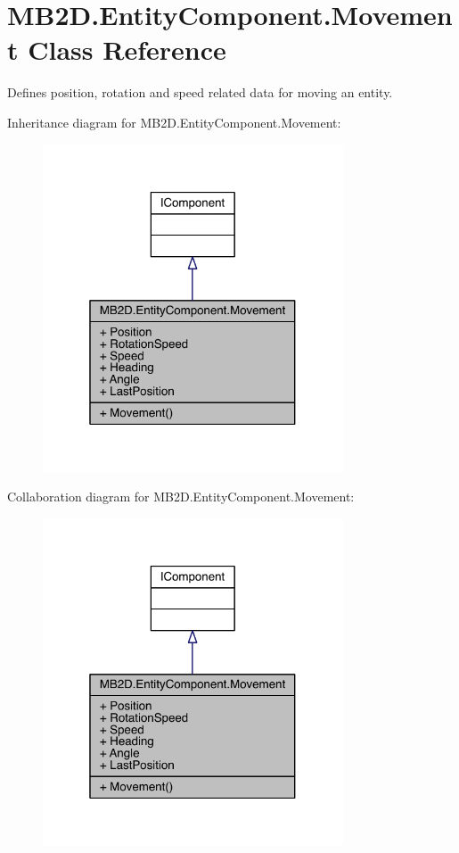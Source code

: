 \hypertarget{class_m_b2_d_1_1_entity_component_1_1_movement}{}\section{M\+B2\+D.\+Entity\+Component.\+Movement Class Reference}
\label{class_m_b2_d_1_1_entity_component_1_1_movement}


Defines position, rotation and speed related data for moving an entity.  




Inheritance diagram for M\+B2\+D.\+Entity\+Component.\+Movement\+:
\nopagebreak
\begin{figure}[H]
\begin{center}
\leavevmode
\includegraphics[width=253pt]{class_m_b2_d_1_1_entity_component_1_1_movement__inherit__graph}
\end{center}
\end{figure}


Collaboration diagram for M\+B2\+D.\+Entity\+Component.\+Movement\+:
\nopagebreak
\begin{figure}[H]
\begin{center}
\leavevmode
\includegraphics[width=253pt]{class_m_b2_d_1_1_entity_component_1_1_movement__coll__graph}
\end{center}
\end{figure}
